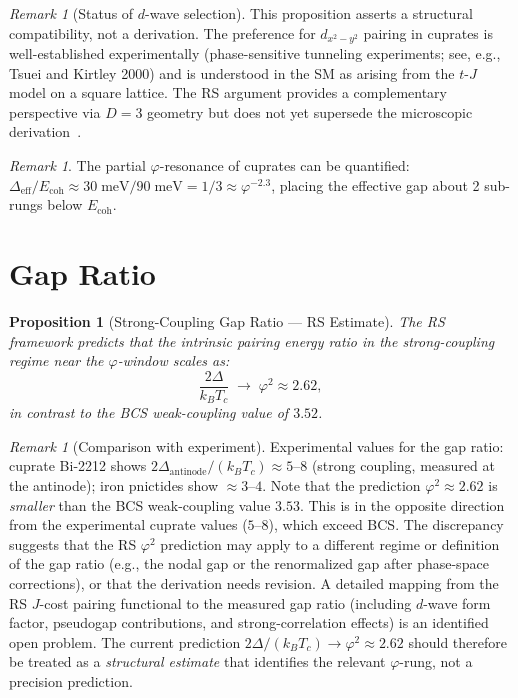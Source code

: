 \documentclass[12pt,a4paper]{article}
\newtheorem{proposition}[theorem]{Proposition}
\theoremstyle{definition}
\theoremstyle{remark}
\newtheorem{remark}[theorem]{Remark}
\begin{document}
\begin{remark}[Status of $d$-wave selection]
This proposition asserts a structural compatibility, not a derivation.
The preference for $d_{x^2-y^2}$ pairing in cuprates is well-established
experimentally (phase-sensitive tunneling experiments; see, e.g.,
Tsuei and Kirtley 2000) and is understood in the SM as arising from the
$t$-$J$ model on a square lattice.  The RS argument provides a
complementary perspective via $D=3$ geometry but does not yet supersede
the microscopic derivation~\cite{Tsuei2000}.
\end{remark}

\begin{remark}
The partial $\varphi$-resonance of cuprates can be quantified:
$\Delta_{\mathrm{eff}}/E_{\mathrm{coh}} \approx
30\;\mathrm{meV}/90\;\mathrm{meV} = 1/3 \approx \varphi^{-2.3}$,
placing the effective gap about 2 sub-rungs below $E_{\mathrm{coh}}$.
\end{remark}

\section{Gap Ratio}
\label{sec:gap-ratio}

\begin{proposition}[Strong-Coupling Gap Ratio --- RS Estimate]
\label{prop:gap-ratio}
The RS framework predicts that the intrinsic pairing energy ratio in
the strong-coupling regime near the $\varphi$-window scales as:
\begin{equation}
  \frac{2\Delta}{k_B T_c} \;\to\; \varphi^2 \approx 2.62,
\end{equation}
in contrast to the BCS weak-coupling value of $3.52$.
\end{proposition}

\begin{remark}[Comparison with experiment]
Experimental values for the gap ratio: cuprate Bi-2212 shows
$2\Delta_{\mathrm{antinode}}/(k_B T_c) \approx 5$--$8$ (strong coupling,
measured at the antinode); iron pnictides show $\approx 3$--$4$.
Note that the prediction $\varphi^2 \approx 2.62$ is \emph{smaller}
than the BCS weak-coupling value $3.53$.  This is in the opposite
direction from the experimental cuprate values ($5$--$8$), which
exceed BCS.  The discrepancy suggests that the RS $\varphi^2$ prediction
may apply to a different regime or definition of the gap ratio
(e.g., the nodal gap or the renormalized gap after phase-space
corrections), or that the derivation needs revision.  A detailed
mapping from the RS $J$-cost pairing functional to the measured
gap ratio (including $d$-wave form factor, pseudogap contributions,
and strong-correlation effects) is an identified open problem.
The current prediction $2\Delta/(k_B T_c) \to \varphi^2 \approx 2.62$
should therefore be treated as a \emph{structural estimate} that
identifies the relevant $\varphi$-rung, not a precision prediction.
\end{remark}
\end{document}
